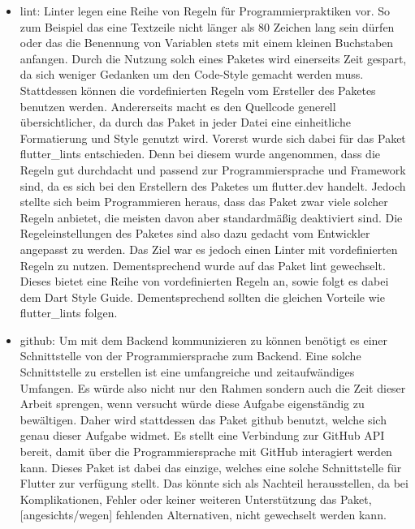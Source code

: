 \begin{itemize}
	\item lint\cite{tech_packageLints}: %
		Linter legen eine Reihe von Regeln für Programmierpraktiken vor. So zum Beispiel das eine Textzeile nicht länger als 80 Zeichen lang sein dürfen oder das die Benennung von Variablen stets mit einem kleinen Buchstaben anfangen. %
		Durch die Nutzung solch eines Paketes wird einerseits Zeit gespart, da sich weniger Gedanken um den Code-Style gemacht werden muss. Stattdessen können die vordefinierten Regeln vom Ersteller des Paketes benutzen werden. %
		Andererseits macht es den Quellcode generell übersichtlicher, da durch das Paket in jeder Datei eine einheitliche Formatierung und Style genutzt wird. %
		Vorerst wurde sich dabei für das Paket flutter\_lints\cite{tech_packageFlutterLints} entschieden. Denn bei diesem wurde angenommen, dass die Regeln gut durchdacht und passend zur Programmiersprache und Framework sind, da es sich bei den Erstellern des Paketes um \glqq flutter.dev\grqq{} handelt. Jedoch stellte sich beim Programmieren heraus, dass das Paket zwar viele solcher Regeln anbietet, die meisten davon aber standardmäßig deaktiviert sind. Die Regeleinstellungen des Paketes sind also dazu gedacht vom Entwickler angepasst zu werden. Das Ziel war es jedoch einen Linter mit vordefinierten Regeln zu nutzen. Dementsprechend wurde auf das Paket lint gewechselt. Dieses bietet eine Reihe von vordefinierten Regeln an, sowie folgt es dabei dem Dart Style Guide\cite{tech_packageDartStyle}. Dementsprechend sollten die gleichen Vorteile wie flutter\_lints folgen.
		
	

	\item github\cite{tech_packageGithub}: 
		Um mit dem Backend kommunizieren zu können benötigt es einer Schnittstelle von der Programmiersprache zum Backend. Eine solche Schnittstelle zu erstellen ist eine umfangreiche und zeitaufwändiges Umfangen. Es würde also nicht nur den Rahmen sondern auch die Zeit dieser Arbeit sprengen, wenn versucht würde diese Aufgabe eigenständig zu bewältigen. %
		Daher wird stattdessen das Paket \glqq github\grqq{} benutzt, welche sich genau dieser Aufgabe widmet. Es stellt eine Verbindung zur GitHub API bereit, damit über die Programmiersprache mit GitHub interagiert werden kann. %
		Dieses Paket ist dabei das einzige, welches eine solche Schnittstelle für Flutter zur verfügung stellt. Das könnte sich als Nachteil herausstellen, da bei Komplikationen, Fehler oder keiner weiteren Unterstützung das Paket, [angesichts/wegen] fehlenden Alternativen, nicht gewechselt werden kann.%
		

\end{itemize}
